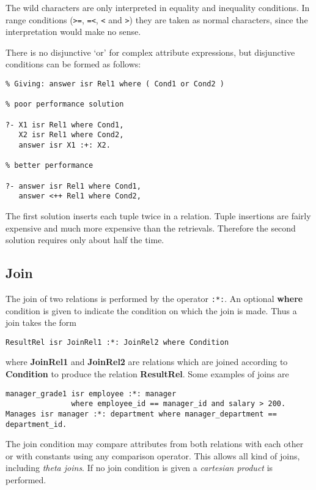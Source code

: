 The wild characters are only interpreted in equality and inequality
conditions. In range 
conditions (\verb->=-, \verb-=<-, \verb-<- and \verb->-)
they are taken as normal characters,
since the interpretation would make no sense.



There is no disjunctive `or' for complex attribute expressions,
but disjunctive conditions can be formed as follows:

\begin{verbatim}
% Giving: answer isr Rel1 where ( Cond1 or Cond2 )

% poor performance solution

?- X1 isr Rel1 where Cond1,
   X2 isr Rel1 where Cond2,
   answer isr X1 :+: X2.

% better performance

?- answer isr Rel1 where Cond1,
   answer <++ Rel1 where Cond2,

\end{verbatim}

The first solution inserts each tuple twice in a relation. Tuple
insertions are fairly expensive and much more expensive than 
the retrievals. Therefore the second solution requires only about
half the time.

\subsection{Join}
\label{joins}  \index{$:*:$}

The join of two relations is performed by the operator \verb-:*:-.
An optional {\bf where} condition is given to indicate the condition on which
the join is made. Thus a join takes the form
\begin{verbatim}
ResultRel isr JoinRel1 :*: JoinRel2 where Condition
\end{verbatim}
where {\bf JoinRel1} and {\bf JoinRel2} are relations 
which are joined according to  {\bf Condition}
to produce the relation {\bf ResultRel}. Some examples of 
joins are
\begin{verbatim}
manager_grade1 isr employee :*: manager 
               where employee_id == manager_id and salary > 200.
Manages isr manager :*: department where manager_department == department_id.
\end{verbatim}

The join condition may compare attributes from both relations
with each other or with constants using any comparison operator.
This allows all kind of joins, including {\em theta joins}.
If no join condition is given a {\em cartesian product} is performed.

